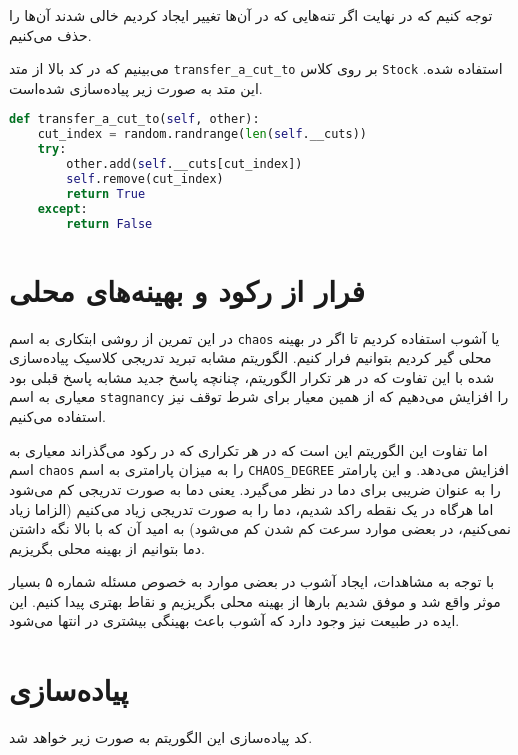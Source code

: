 \documentclass[a4paper, 12pt]{article}
\begin{document}
توجه کنیم که در نهایت اگر تنه‌هایی که در آن‌ها تغییر ایجاد کردیم خالی شدند آن‌ها را حذف می‌کنیم.

می‌بینیم که در کد بالا از متد
\texttt{transfer\_a\_cut\_to}
بر روی کلاس
\texttt{Stock}
استفاده شده. این متد به صورت زیر پیاده‌سازی شده‌است.

\LTR
\begin{lstlisting}[language=Python]
def transfer_a_cut_to(self, other):
    cut_index = random.randrange(len(self.__cuts))
    try:
        other.add(self.__cuts[cut_index])
        self.remove(cut_index)
        return True
    except:
        return False
\end{lstlisting}
\RTL

\newpage
\section{فرار از رکود و بهینه‌های محلی}
در این تمرین از روشی ابتکاری به اسم
\texttt{chaos}
یا آشوب استفاده کردیم تا اگر در بهینه محلی گیر کردیم بتوانیم فرار کنیم. الگوریتم مشابه تبرید تدریجی کلاسیک پیاده‌سازی شده با این تفاوت که در هر تکرار الگوریتم، چنانچه پاسخ جدید مشابه پاسخ قبلی بود معیاری به اسم
\texttt{stagnancy}
را افزایش می‌دهیم که از همین معیار برای شرط توقف نیز استفاده می‌کنیم.

اما تفاوت این الگوریتم این است که در هر تکراری که در رکود می‌گذراند معیاری به اسم
\texttt{chaos}
را به میزان پارامتری به اسم
\texttt{CHAOS\_DEGREE}
افزایش می‌دهد. و این پارامتر را به عنوان ضریبی برای دما در نظر می‌گیرد. یعنی دما به صورت تدریجی کم می‌شود اما هرگاه در یک نقطه راکد شدیم، دما را به صورت تدریجی زیاد می‌کنیم (الزاما زیاد نمی‌کنیم، در بعضی موارد سرعت کم شدن کم می‌شود) به امید آن که با بالا نگه داشتن دما بتوانیم از بهینه محلی بگریزیم.

با توجه به مشاهدات، ایجاد آشوب در بعضی موارد به خصوص مسئله شماره ۵ بسیار موثر واقع شد و موفق شدیم بارها از بهینه محلی بگریزیم و نقاط بهتری پیدا کنیم. این ایده در طبیعت نیز وجود دارد که آشوب باعث بهینگی بیشتری در انتها می‌شود.

\newpage
\section{پیاده‌سازی}
کد پیاده‌سازی این الگوریتم به صورت زیر خواهد شد.
\end{document}
